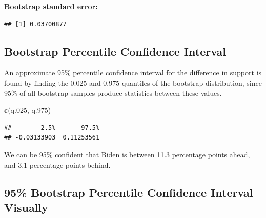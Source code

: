 \documentclass[]{book}
\newenvironment{Shaded}{\begin{snugshade}}{\end{snugshade}}
\newcommand{\KeywordTok}[1]{\textcolor[rgb]{0.13,0.29,0.53}{\textbf{#1}}}
\newcommand{\DecValTok}[1]{\textcolor[rgb]{0.00,0.00,0.81}{#1}}
\newcommand{\FloatTok}[1]{\textcolor[rgb]{0.00,0.00,0.81}{#1}}
\newcommand{\StringTok}[1]{\textcolor[rgb]{0.31,0.60,0.02}{#1}}
\newcommand{\OperatorTok}[1]{\textcolor[rgb]{0.81,0.36,0.00}{\textbf{#1}}}
\newcommand{\NormalTok}[1]{#1}
\begin{document}
\textbf{Bootstrap standard error:}

\begin{Shaded}
\end{Shaded}

\begin{verbatim}
## [1] 0.03700877
\end{verbatim}

\subsection{Bootstrap Percentile Confidence
Interval}\label{bootstrap-percentile-confidence-interval}

An approximate 95\% percentile confidence interval for the difference in
support is found by finding the 0.025 and 0.975 quantiles of the
bootstrap distribution, since 95\% of all bootstrap samples produce
statistics between these values.

\begin{Shaded}
\end{Shaded}

\begin{Shaded}
\begin{Highlighting}[]
\KeywordTok{c}\NormalTok{(q.}\DecValTok{025}\NormalTok{, q.}\DecValTok{975}\NormalTok{)}
\end{Highlighting}
\end{Shaded}

\begin{verbatim}
##        2.5%       97.5% 
## -0.03133903  0.11253561
\end{verbatim}

We can be 95\% confident that Biden is between 11.3 percentage points
ahead, and 3.1 percentage points behind.

\subsection{95\% Bootstrap Percentile Confidence Interval
Visually}\label{bootstrap-percentile-confidence-interval-visually}
\end{document}

